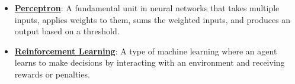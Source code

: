 \documentclass{article}%
\begin{document}
\begin{itemize}[leftmargin=*]
\item \href{https://purdue.brightspace.com/d2l/common/assets/pdfjs-d2l-dist/1.0.14-legacy/web/viewer.html?file=\%2Fcontent\%2Fenforced\%2F1095467-wl.202510.CS.24300.001\%2F02L2-Intro.pdf\%3Fou\%3D1095467\&lang=en-us\&container=d2l-fileviewer-rendered-pdf\&fullscreen=d2l-fileviewer-rendered-pdf-dialog\&height=667#page=45}{\textbf{Perceptron}}: A fundamental unit in neural networks that takes multiple inputs, applies weights to them, sums the weighted inputs, and produces an output based on a threshold.%
\item \href{https://purdue.brightspace.com/d2l/common/assets/pdfjs-d2l-dist/1.0.14-legacy/web/viewer.html?file=\%2Fcontent\%2Fenforced\%2F1095467-wl.202510.CS.24300.001\%2F02L2-Intro.pdf\%3Fou\%3D1095467\&lang=en-us\&container=d2l-fileviewer-rendered-pdf\&fullscreen=d2l-fileviewer-rendered-pdf-dialog\&height=667#page=46}{\textbf{Reinforcement Learning}}: A type of machine learning where an agent learns to make decisions by interacting with an environment and receiving rewards or penalties.%
\end{itemize}%
\end{document}
